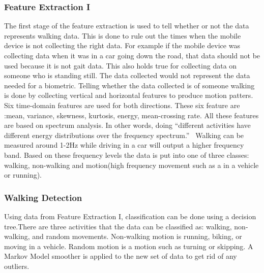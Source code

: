 \documentclass{sig-alternate}
\begin{document}
\subsubsection{Feature Extraction I}
	The first stage of the feature extraction is used to tell whether or not the data represents walking data. This is done to rule out the times when the mobile device is not collecting the right data. For example if the mobile device was collecting data when it was in a car going down the road, that data should not be used because it is not gait data. This also holds true for collecting data on someone who is standing still. The data collected would not represent the data needed for a biometric. Telling whether the data collected is of someone walking is done by collecting vertical and horizontal features to produce motion patters. Six time-domain features are used for both directions. These six feature are :mean, variance, skewness, kurtosis, energy, mean-crossing rate. All these features are based on spectrum analysis. In other words, doing ``different activities have different energy distributions over the frequency spectrum.''~\cite{Lu:2014} Walking can be measured around 1-2Hz while driving in a car will output a higher frequency band. Based on these frequency levels the data is put into one of three classes: walking, non-walking and motion(high frequency movement such as a in a vehicle or running).~\cite{Muaaz:2013}
\subsubsection{Walking Detection}
	Using data from Feature Extraction I, classification can be done using a decision tree.There are three activities that the data can be classified as: walking, non-walking, and random movements. Non-walking motion is running, biking, or moving in a vehicle. Random motion is a motion such as turning or skipping. A Markov Model smoother is applied to the new set of data to get rid of any outliers. 
\end{document}
